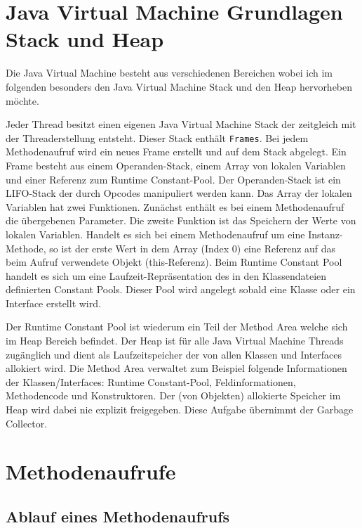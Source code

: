 \documentclass[conference]{IEEEtran}
\begin{document}
\section{Java Virtual Machine Grundlagen Stack und Heap}

Die Java Virtual Machine besteht aus verschiedenen Bereichen wobei ich im folgenden besonders den Java Virtual Machine Stack und den Heap hervorheben möchte.

Jeder Thread besitzt einen eigenen Java Virtual Machine Stack der zeitgleich mit der Threaderstellung entsteht. Dieser Stack enthält \verb|Frames|. Bei jedem Methodenaufruf wird ein neues Frame erstellt und auf dem Stack abgelegt. Ein Frame besteht aus einem Operanden-Stack, einem Array von lokalen Variablen und einer Referenz zum Runtime Constant-Pool. Der Operanden-Stack ist ein LIFO-Stack der durch Opcodes manipuliert werden kann. Das Array der lokalen Variablen hat zwei Funktionen. Zunächst enthält es bei einem Methodenaufruf die übergebenen Parameter. Die zweite Funktion ist das Speichern der Werte von lokalen Variablen. Handelt es sich bei einem Methodenaufruf um eine Instanz-Methode, so ist der erste Wert in dem Array (Index 0) eine Referenz auf das beim Aufruf verwendete Objekt (this-Referenz). Beim Runtime Constant Pool handelt es sich um eine Laufzeit-Repräsentation des in den Klassendateien definierten Constant Pools. Dieser Pool wird angelegt sobald eine Klasse oder ein Interface erstellt wird. 

Der Runtime Constant Pool ist wiederum ein Teil der Method Area welche sich im Heap Bereich befindet. Der Heap ist für alle Java Virtual Machine Threads zugänglich und dient als Laufzeitspeicher der von allen Klassen und Interfaces allokiert wird. Die Method Area verwaltet zum Beispiel folgende Informationen der Klassen/Interfaces: Runtime Constant-Pool, Feldinformationen, Methodencode und Konstruktoren. Der (von Objekten) allokierte Speicher im Heap wird dabei nie explizit freigegeben. Diese Aufgabe übernimmt der Garbage Collector. \cite{Lindholm.21.08.2018}



\section{Methodenaufrufe}
\subsection{Ablauf eines Methodenaufrufs}
\end{document}

